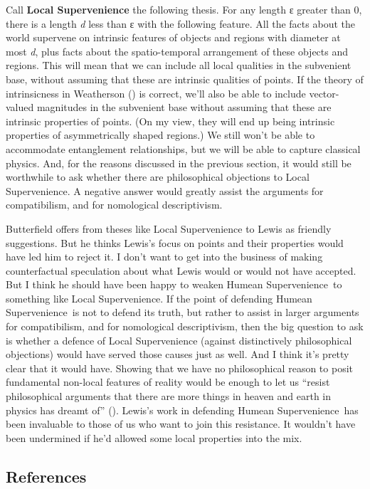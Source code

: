 \documentclass[
  11pt,
  letterpaper,
  DIV=11,
  numbers=noendperiod,
  twoside]{scrartcl}
\begin{document}
Call \textbf{Local Supervenience} the following thesis. For any length ε
greater than 0, there is a length \emph{d} less than ε with the
following feature. All the facts about the world supervene on intrinsic
features of objects and regions with diameter at most \emph{d}, plus
facts about the spatio-temporal arrangement of these objects and
regions. This will mean that we can include all local qualities in the
subvenient base, without assuming that these are intrinsic qualities of
points. If the theory of intrinsicness in Weatherson
() is correct, we'll also be
able to include vector-valued magnitudes in the subvenient base without
assuming that these are intrinsic properties of points. (On my view,
they will end up being intrinsic properties of asymmetrically shaped
regions.) We still won't be able to accommodate entanglement
relationships, but we will be able to capture classical physics. And,
for the reasons discussed in the previous section, it would still be
worthwhile to ask whether there are philosophical objections to Local
Supervenience. A negative answer would greatly assist the arguments for
compatibilism, and for nomological descriptivism.

Butterfield offers from theses like Local Supervenience to Lewis as
friendly suggestions. But he thinks Lewis's focus on points and their
properties would have led him to reject it. I don't want to get into the
business of making counterfactual speculation about what Lewis would or
would not have accepted. But I think he should have been happy to weaken
Humean Supervenience~to something like Local Supervenience. If the point
of defending Humean Supervenience~is not to defend its truth, but rather
to assist in larger arguments for compatibilism, and for nomological
descriptivism, then the big question to ask is whether a defence of
Local Supervenience (against distinctively philosophical objections)
would have served those causes just as well. And I think it's pretty
clear that it would have. Showing that we have no philosophical reason
to posit fundamental non-local features of reality would be enough to
let us ``resist philosophical arguments that there are more things in
heaven and earth in physics has dreamt of''
(). Lewis's work in defending
Humean Supervenience~has been invaluable to those of us who want to join
this resistance. It wouldn't have been undermined if he'd allowed some
local properties into the mix.

\subsection*{References}\label{references}
\end{document}

